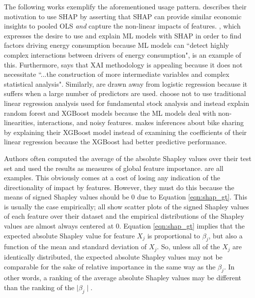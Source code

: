 \documentclass[mnsc,blindrev]{informs3}
\begin{document}
    The following works exemplify the aforementioned usage pattern. \cite{berger2023supply} describes their motivation to use SHAP by asserting that SHAP can provide similar economic insights to pooled OLS \emph{and} capture the non-linear impacts of features. \citep{srivastava23energy}, which expresses the desire to use and explain ML models with SHAP in order to find factors driving energy consumption because ML models can ``detect highly complex interactions between drivers of energy consumption", is an example of this. Furthermore, \cite{zhou23consumption} says that XAI methodology is appealing because it does not necessitate ``...the construction of more intermediate variables and complex statistical analysis". Similarly, \citep{banulescu2023practical} are drawn away from logistic regression because it suffers when a large number of predictors are used. \cite{hanauer22boosting} choose not to use traditional linear regression analysis used for fundamental stock analysis and instead explain random forest and XGBoost models because the ML models deal with non-linearities, interactions, and noisy features. \cite{li24roles} makes inferences about bike sharing by explaining their XGBoost model instead of examining the coefficients of their linear regression because the XGBoost had better predictive performance. 

    Authors often computed the average of the absolute Shapley values over their test set and used the results as measures of global feature importance. \cite{lenaers23rent,maeng23vr,guenther2023useful} are all examples. This obviously comes at a cost of losing any indication of the directionality of impact by features. However, they must do this because the means of signed Shapley values should be 0 due to Equation \ref{eqn:shap_gt}. This is usually the case empirically; \citep{lenaers23rent,maeng23vr,jiang24churn} all show scatter plots of the signed Shapley values of each feature over their dataset and the empirical distributions of the Shapley values are almost always centered at 0. Equation \ref{eqn:shap_gt} implies that the expected absolute Shapley value for feature $X_j$ is proportional to $\beta_j$, but also a function of the mean and standard deviation of $X_j$. So, unless all of the $X_j$ are identically distributed, the expected absolute Shapley values may not be comparable for the sake of relative importance in the same way as the $\beta_j$. In other words, a ranking of the average absolute Shapley values may be different than the ranking of the $\mid \beta_j\mid$.  %
\end{document}
